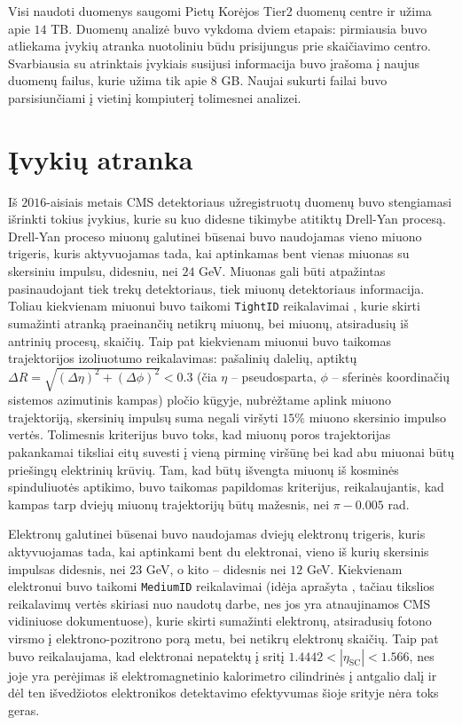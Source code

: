 \documentclass[a4paper, 12pt]{article}
\newcommand{\ttt}[1]{\texttt{#1}}
\newlength\q
\begin{document}
Visi naudoti duomenys saugomi Pietų Korėjos Tier2 duomenų centre ir užima apie $14$ TB.
Duomenų analizė buvo vykdoma dviem etapais: pirmiausia buvo atliekama įvykių atranka nuotoliniu būdu prisijungus
prie skaičiavimo centro.
Svarbiausia su atrinktais įvykiais susijusi informacija buvo įrašoma į naujus duomenų failus, kurie užima tik
apie $8$ GB.
Naujai sukurti failai buvo parsisiunčiami į vietinį kompiuterį tolimesnei analizei.


\section{Įvykių atranka}\label{sec:selection}
Iš $2016$-aisiais metais CMS detektoriaus užregistruotų duomenų buvo stengiamasi išrinkti tokius įvykius, kurie
su kuo didesne tikimybe atitiktų Drell-Yan procesą.
Drell-Yan proceso miuonų galutinei būsenai buvo naudojamas vieno miuono trigeris, kuris aktyvuojamas tada,
kai aptinkamas bent vienas miuonas su skersiniu impulsu, didesniu, nei $24$ GeV.
Miuonas gali būti atpažintas pasinaudojant tiek trekų detektoriaus, tiek miuonų detektoriaus informacija.
Toliau kiekvienam miuonui buvo taikomi \ttt{TightID} reikalavimai \cite{MuonID}, kurie skirti sumažinti atranką
praeinančių netikrų miuonų, bei miuonų, atsiradusių iš antrinių procesų, skaičių.
Taip pat kiekvienam miuonui buvo taikomas trajektorijos izoliuotumo reikalavimas: pašalinių dalelių, aptiktų
$\Delta R = \sqrt{(\Delta\eta)^2 + (\Delta\phi)^2} < 0.3$ (čia $\eta$ -- pseudosparta, $\phi$ -- sferinės koordinačių
sistemos azimutinis kampas) pločio kūgyje, nubrėžtame aplink miuono trajektoriją, skersinių impulsų suma negali
viršyti $15\%$ miuono skersinio impulso vertės.
Tolimesnis kriterijus buvo toks, kad miuonų poros trajektorijas pakankamai tiksliai eitų suvesti į vieną pirminę
viršūnę bei kad abu miuonai būtų priešingų elektrinių krūvių.
Tam, kad būtų išvengta miuonų iš kosminės spinduliuotės aptikimo, buvo taikomas papildomas kriterijus, reikalaujantis,
kad kampas tarp dviejų miuonų trajektorijų būtų mažesnis, nei $\pi-0.005$ rad.

Elektronų galutinei būsenai buvo naudojamas dviejų elektronų trigeris, kuris aktyvuojamas tada, kai aptinkami
bent du elektronai, vieno iš kurių skersinis impulsas didesnis, nei $23$ GeV, o kito -- didesnis nei $12$ GeV.
Kiekvienam elektronui buvo taikomi \ttt{MediumID} reikalavimai (idėja aprašyta \cite{EleID}, tačiau tikslios
reikalavimų vertės skiriasi nuo naudotų darbe, nes jos yra atnaujinamos CMS vidiniuose dokumentuose), kurie
skirti sumažinti elektronų, atsiradusių fotono virsmo į elektrono-pozitrono porą metu, bei netikrų elektronų
skaičių.
Taip pat buvo reikalaujama, kad elektronai nepatektų į sritį $1.4442<|\eta_{\mathrm{SC}}|<1.566$, nes joje
yra perėjimas iš elektromagnetinio kalorimetro cilindrinės į antgalio dalį ir dėl ten išvedžiotos elektronikos
detektavimo efektyvumas šioje srityje nėra toks geras.
\end{document}
